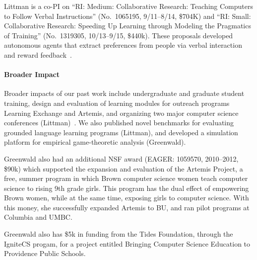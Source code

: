 Littman is a co-PI on ``RI: Medium: Collaborative Research: Teaching
Computers to Follow Verbal Instructions'' (No.\ 1065195, 9/11--8/14,
\$704K) and ``RI: Small: Collaborative Research: Speeding Up Learning
through Modeling the Pragmatics of Training'' (No.\ 1319305,
10/13--9/15, \$440k). These proposals developed autonomous agents that
extract preferences from people via verbal interaction and reward
feedback~\cite{loftin14b,macglashan15,macglashan15b}.

\paragraph{Broader Impact}

Broader impacts of our past work include undergraduate and graduate
student training, design and evaluation of learning modules for
outreach programs Learning Exchange and Artemis, and organizing two
major computer science conferences (Littman)~\cite{desjardins13}.
We also published novel benchmarks for evaluating grounded language
learning programs (Littman), and developed a simulation platform for
empirical game-theoretic analysis (Greenwald).

Greenwald also had an additional NSF award (EAGER: 1059570,
2010--2012, \$90k) which supported the expansion and evaluation of the
Artemis Project, a free, summer program in which Brown computer
science women teach computer science to rising 9th grade girls.  This
program has the dual effect of empowering Brown women, while at the
same time, exposing girls to computer science.  With this money, she
successfully expanded Artemis to BU, and ran pilot programs at
Columbia and UMBC.

Greenwald also has \$5k in funding from the Tides Foundation, through
the IgniteCS progam, for a project entitled Bringing Computer Science
Education to Providence Public Schools.

